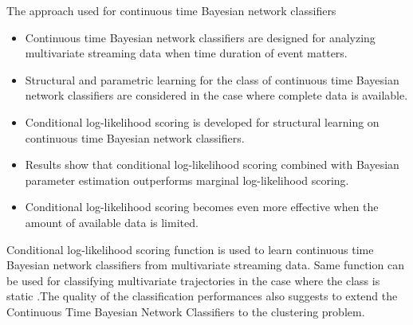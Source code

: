 The approach used for continuous time Bayesian network classifiers
  \begin{itemize}
    \item Continuous time Bayesian network classifiers are designed for analyzing multivariate streaming data when time duration of event matters.
    \item Structural and parametric learning for the class of continuous time  Bayesian network  classifiers are  considered  in  the  case where  complete  data is available.
    \item Conditional log-likelihood  scoring is developed for structural learning on continuous time Bayesian network classifiers.
   \item Results show that conditional  log-likelihood  scoring combined with Bayesian parameter estimation outperforms marginal log-likelihood scoring.
   \item Conditional log-likelihood  scoring becomes even more effective when  the amount of available data is limited.
\end{itemize}

Conditional log-likelihood scoring function is used  to learn continuous time Bayesian network classifiers from multivariate streaming  data.
Same function can be used for classifying multivariate trajectories in the case where the class is static .The quality of the classification performances also suggests to extend the Continuous Time Bayesian Network Classifiers to the clustering problem.
















